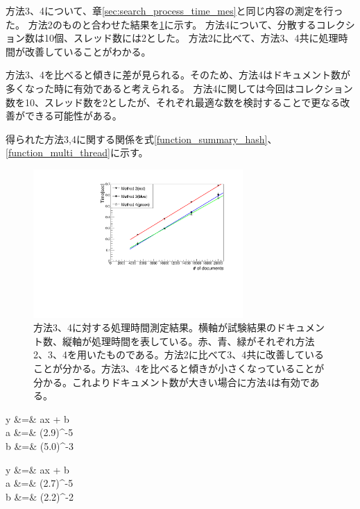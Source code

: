 方法3、4について、章\ref{sec:search_process_time_mes}と同じ内容の測定を行った。
方法2のものと合わせた結果を\ref{searching_time_2}に示す。
方法4について、分散するコレクション数は10個、スレッド数には2とした。
方法2に比べて、方法3、4共に処理時間が改善していることがわかる。

方法3、4を比べると傾きに差が見られる。そのため、方法4はドキュメント数が多くなった時に有効であると考えられる。
方法4に関しては今回はコレクション数を10、スレッド数を2としたが、それぞれ最適な数を検討することで更なる改善ができる可能性がある。

得られた方法3,4に関する関係を式\ref{function_summary_hash}、\ref{function_multi_thread}に示す。

\begin{figure}[bpt]
  \begin{center}
    \includegraphics[width=8cm,angle=270]{./searching_time_2.pdf}
  \caption[方法3、4に対する処理時間測定結果]{方法3、4に対する処理時間測定結果。横軸が試験結果のドキュメント数、縦軸が処理時間を表している。赤、青、緑がそれぞれ方法2、3、4を用いたものである。方法2に比べて3、4共に改善していることが分かる。方法3、4を比べると傾きが小さくなっていることが分かる。これよりドキュメント数が大きい場合に方法4は有効である。}
  \label{searching_time_2}
  \end{center}
\end{figure}

\bbb
y &=& ax + b \\
\label{function_summary_hash}
a &=& (2.9)^{-5} \nonumber \\
b &=& (5.0)^{-3} \nonumber
\eee

\bbb
y &=& ax + b \\
\label{function_multi_thread}
a &=& (2.7)^{-5} \nonumber \\
b &=& (2.2)^{-2} \nonumber
\eee


